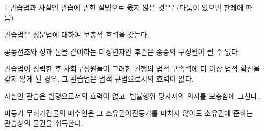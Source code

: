 \begin{question}{1}
관습법과 사실인 관습에 관한 설명으로 옳지 않은 것은? (다툼이 있으면 판례에 따름)
\begin{choices}
  \item 관습법은 성문법에 대하여 보충적 효력을 갖는다.
  \item 공동선조와 성과 본을 같이하는 미성년자인 후손은 종중의 구성원이 될 수 없다.
  \item 관습법이 성립한 후 사회구성원들이 그러한 관행의 법적 구속력에 더 이상 법적 확신을 갖지 않게 된 경우, 그 관습법은 법적 규범으로서의 효력이 없다.
  \item 사실인 관습은 법령으로서의 효력이 없고, 법률행위 당사자의 의사를 보충함에 그친다.
  \item 미등기 무허가건물의 매수인은 그 소유권이전등기를 마치지 않아도 소유권에 준하는 관습상의 물권을 취득한다.
\end{choices}
\end{question}
